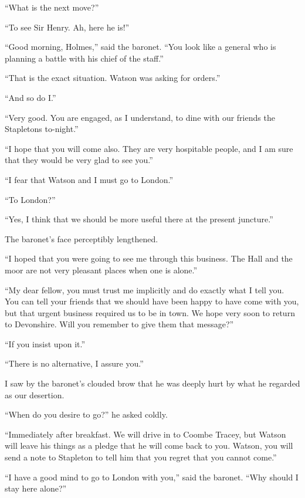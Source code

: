 \documentclass[paper=5.5in:8.5in,BCOR=7mm,twoside,DIV=calc,12pt,usegeometry,openany,chapterprefix,endperiod,headings=big]{scrbook} %
\begin{document}
\enquote{What is the next move?}

\enquote{To see Sir Henry. Ah, here he is!}

\enquote{Good morning, Holmes,} said the baronet. \enquote{You look like a general who is planning a battle with his chief of the staff.}

\enquote{That is the exact situation. Watson was asking for orders.}

\enquote{And so do I.}

\enquote{Very good. You are engaged, as I understand, to dine with our friends the Stapletons to-night.}

\enquote{I hope that you will come also. They are very hospitable people, and I am sure that they would be very glad to see you.}

\enquote{I fear that Watson and I must go to London.}

\enquote{To London?}

\enquote{Yes, I think that we should be more useful there at the present juncture.}

The baronet's face perceptibly lengthened.

\enquote{I hoped that you were going to see me through this business. The Hall and the moor are not very pleasant places when one is alone.}

\enquote{My dear fellow, you must trust me implicitly and do exactly what I tell you. You can tell your friends that we should have been happy to have come with you, but that urgent business required us to be in town. We hope very soon to return to Devonshire. Will you remember to give them that message?}

\enquote{If you insist upon it.}

\enquote{There is no alternative, I assure you.}

I saw by the baronet's clouded brow that he was deeply hurt by what he regarded as our desertion.

\enquote{When do you desire to go?} he asked coldly.

\enquote{Immediately after breakfast. We will drive in to Coombe \newline Tracey, but Watson will leave his things as a pledge that he will come back to you. Watson, you will send a note to Stapleton to tell him that you regret that you cannot come.}

\enquote{I have a good mind to go to London with you,} said the baronet. \enquote{Why should I stay here alone?}
\end{document}
